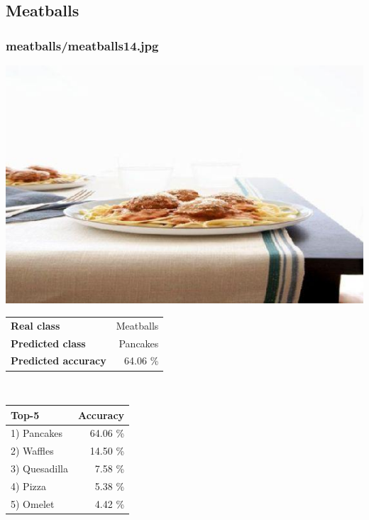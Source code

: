 \subsection{Meatballs}
    
\subsubsection{meatballs/meatballs14.jpg}

\begin{minipage}[t]{0.4\textwidth}
	\vspace{0pt}
	\includegraphics[width=\linewidth]{images/evaluation-images/meatballs/meatballs14.jpg}
\end{minipage}
\hfill
\begin{minipage}[t]{0.5\textwidth}
	\vspace{0pt}\raggedright
	\begin{tabularx}{\textwidth}{X r}
		\small \textbf{Real class} & \small Meatballs\\
		\small \textbf{Predicted class} & \small Pancakes\\
		\small \textbf{Predicted accuracy} & \small 64.06 \%
    \end{tabularx}\\
    
    \vspace{6pt}
	\begin{tabularx}{\textwidth}{X r}
        \small \textbf{Top-5} & \small \textbf{Accuracy} \\
        \hline
		\small 1) Pancakes & \small 64.06 \%\\\small 2) Waffles & \small 14.50 \%\\\small 3) Quesadilla & \small 7.58 \%\\\small 4) Pizza & \small 5.38 \%\\\small 5) Omelet & \small 4.42 \%
    \end{tabularx}
\end{minipage}
    

